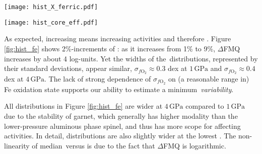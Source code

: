 \begin{figure*}
\centering
  \texttt{[image: hist\_X\_ferric.pdf]}
\caption[The distributions of mantle oxygen fugacities resulting from stellar chemical variability: dependence on /$\Sigma$Fe.]{The distributions of mantle oxygen fugacities expressed as $\Delta$FMQ, resulting from chemical variability in Hypatia host stars. Distributions are shown for different mantle /$\Sigma$Fe ratios and assuming $f^{\rm Fe}_{\rm mantle} = 12$\%, at $1\,{\rm GPa}$ \textit{(top)} or $4\,{\rm GPa}$ \textit{(bottom)}, using the pMELTS \textit{(left)} or JH-15 in Perple\_X \textit{(right)} models. Calculations are shown at $1473\,{\rm K}$ to ensure more compositions have numerically-stable solutions. Standard deviations $\sigma_{f\text{O}_2}$ of each distribution are shown in the upper right corners.\label{fig:hist_fe}}
\end{figure*}
\begin{figure*}
\centering
  \texttt{[image: hist\_core\_eff.pdf]}
\caption[The distributions of mantle oxygen fugacities resulting from stellar chemical variability: dependence on the extent of core formation.]{The same as Figure \ref{fig:hist_fe}, but showing $\Delta$FMQ distributions for different assumptions about the bulk planet iron partitioning ${\rm Fe}_{\rm mantle}/({\rm Fe}_{\rm core} + {\rm Fe}_{\rm mantle}) = f^{\rm Fe}_{\rm mantle}$, for mantle ${\rm Fe}^{3+}/\Sigma{\rm Fe} = 3$\%. Note the different $x$-axis scales between models and between here and Figure \ref{fig:hist_fe}.\label{fig:hist_core}}
\end{figure*}





As expected, increasing \xfer\;means increasing  activities and therefore \fo. Figure \ref{fig:hist_fe} shows 2\%-increments of \xfer: as it increases from 1\% to 9\%, $\Delta$FMQ increases by about 4 log-units. Yet the widths of the \fo\,distributions, represented by their standard deviations, appear similar, $\sigma_{f\text{O}_2} \approx 0.3$ dex at $1\,\text{GPa}$ and $\sigma_{f\text{O}_2} \approx 0.4$ dex at $4\,\text{GPa}$. The lack of strong dependence of $\sigma_{f\text{O}_2}$ on (a reasonable range in) Fe oxidation state supports our ability to estimate a minimum \fo\,\emph{variability}.%

All distributions in Figure \ref{fig:hist_fe} are wider at $4\,\text{GPa}$ compared to $1\,\text{GPa}$ due to the stability of garnet, which generally has higher modality than the lower-pressure aluminous phase spinel, and thus has more scope for affecting \ferric\,activities. In detail, distributions are also slightly wider at the lowest \ferric. The non-linearity of median \fo\,versus \xfer\;is due to the fact that $\Delta$FMQ is logarithmic.%



